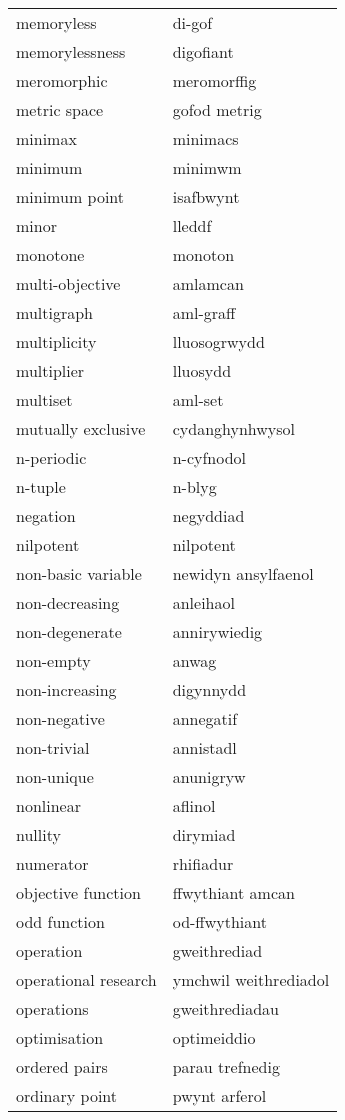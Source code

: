 \begin{supertabular}{p{0.22\textwidth}p{0.22\textwidth}}
memoryless & di-gof \\
memorylessness & digofiant \\
meromorphic & meromorffig \\
metric space & gofod metrig \\
minimax & minimacs \\
minimum & minimwm \\
minimum point & isafbwynt \\
minor & lleddf \\
monotone & monoton \\
multi-objective & amlamcan \\
multigraph & aml-graff \\
multiplicity & lluosogrwydd \\
multiplier & lluosydd \\
multiset & aml-set \\
mutually exclusive & cydanghynhwysol \\
n-periodic & n-cyfnodol \\
n-tuple & n-blyg \\
negation & negyddiad \\
nilpotent & nilpotent \\
non-basic variable & newidyn ansylfaenol \\
non-decreasing & anleihaol \\
non-degenerate & annirywiedig \\
non-empty & anwag \\
non-increasing & digynnydd \\
non-negative & annegatif \\
non-trivial & annistadl \\
non-unique & anunigryw \\
nonlinear & aflinol \\
nullity & dirymiad \\
numerator & rhifiadur \\
objective function & ffwythiant amcan \\
odd function & od-ffwythiant \\
operation & gweithrediad \\
operational research & ymchwil weithrediadol \\
operations & gweithrediadau \\
optimisation & optimeiddio \\
ordered pairs & parau trefnedig \\
ordinary point & pwynt arferol \\

\end{supertabular}
